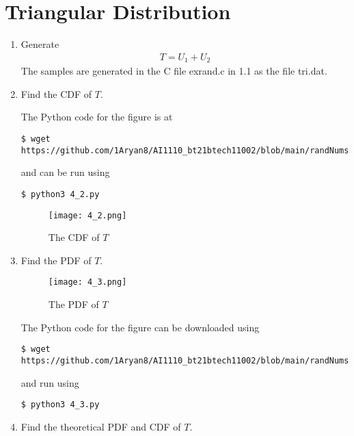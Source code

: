 \documentclass[journal,12pt,twocolumn]{IEEEtran}
\renewcommand\thesection{\arabic{section}}
\begin{document}
\section{Triangular Distribution}
\begin{enumerate}[label=\thesection.\arabic*
,ref=\thesection.\theenumi]
\item Generate
	\begin{align}
		T = U_1 + U_2
	\end{align}
\solution
The samples are generated in the C file exrand.c in 1.1 as the file tri.dat.

\item Find the CDF of $T$.

\solution
The Python code for the figure is at
\begin{lstlisting}
$ wget https://github.com/1Aryan8/AI1110_bt21btech11002/blob/main/randNums(sim)/codes/4_2.py
\end{lstlisting}
and can be run using
\begin{lstlisting}
$ python3 4_2.py
\end{lstlisting}
\begin{figure}[!htb]
	\texttt{[image: 4\_2.png]}
	\caption{The CDF of $T$}
	\label{fig:tri-cdf}
\end{figure}

\item Find the PDF of $T$.
	\begin{figure}
		\texttt{[image: 4\_3.png]}
		\caption{The PDF of $T$}
		\label{fig:tri-pdf}
	\end{figure}
	
\solution
The Python code for the figure can be downloaded using 
\begin{lstlisting}
$ wget https://github.com/1Aryan8/AI1110_bt21btech11002/blob/main/randNums(sim)/codes/4_3.py
\end{lstlisting}
and run using
\begin{lstlisting}
$ python3 4_3.py
\end{lstlisting}

\item Find the theoretical PDF and CDF of $T$.


\end{enumerate}
\end{document}
